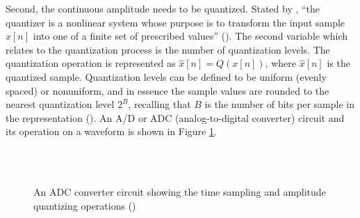 \documentclass[report.tex]{subfiles}
\begin{document}
Second, the continuous amplitude needs to be quantized. Stated by \citeauthor{discretebook}, ``the quantizer is a nonlinear system whose purpose is to transform the input sample $x[n]$ into one of a finite set of prescribed values'' (\cite[190]{discretebook}). The second variable which relates to the quantization process is the number of quantization levels. The quantization operation is represented as $ \hat{x}[n] = Q(x[n])$, where $\hat{x}[n]$ is the quantized sample. Quantization levels can be defined to be uniform (evenly spaced) or nonuniform, and in essence the sample values are rounded to the nearest quantization level $2^{B}$, recalling that $B$ is the number of bits per sample in the representation (\cite{discretebook}). An A/D or ADC (analog-to-digital converter) circuit and its operation on a waveform is shown in Figure \ref{fig:adccircuit}.

\begin{figure}[ht]
	\centering
	\hspace{0.1em}
	\\
	\vspace{0.1em}
	\\
	\caption{An ADC converter circuit showing the time sampling and amplitude quantizing operations (\cite[188, 190, 192]{discretebook})}
	\label{fig:adccircuit}
\end{figure}
\end{document}
